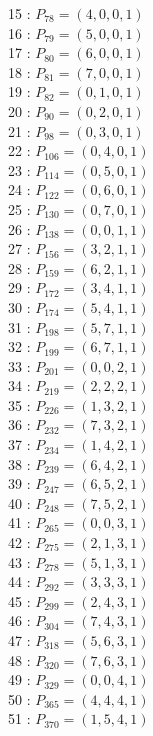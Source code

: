 \documentclass{article}
\begin{document}
{\begin{multicols}{3}
15 : $P_{78}=( 4, 0, 0, 1 )$\\
16 : $P_{79}=( 5, 0, 0, 1 )$\\
17 : $P_{80}=( 6, 0, 0, 1 )$\\
18 : $P_{81}=( 7, 0, 0, 1 )$\\
19 : $P_{82}=( 0, 1, 0, 1 )$\\
20 : $P_{90}=( 0, 2, 0, 1 )$\\
21 : $P_{98}=( 0, 3, 0, 1 )$\\
22 : $P_{106}=( 0, 4, 0, 1 )$\\
23 : $P_{114}=( 0, 5, 0, 1 )$\\
24 : $P_{122}=( 0, 6, 0, 1 )$\\
25 : $P_{130}=( 0, 7, 0, 1 )$\\
26 : $P_{138}=( 0, 0, 1, 1 )$\\
27 : $P_{156}=( 3, 2, 1, 1 )$\\
28 : $P_{159}=( 6, 2, 1, 1 )$\\
29 : $P_{172}=( 3, 4, 1, 1 )$\\
30 : $P_{174}=( 5, 4, 1, 1 )$\\
31 : $P_{198}=( 5, 7, 1, 1 )$\\
32 : $P_{199}=( 6, 7, 1, 1 )$\\
33 : $P_{201}=( 0, 0, 2, 1 )$\\
34 : $P_{219}=( 2, 2, 2, 1 )$\\
35 : $P_{226}=( 1, 3, 2, 1 )$\\
36 : $P_{232}=( 7, 3, 2, 1 )$\\
37 : $P_{234}=( 1, 4, 2, 1 )$\\
38 : $P_{239}=( 6, 4, 2, 1 )$\\
39 : $P_{247}=( 6, 5, 2, 1 )$\\
40 : $P_{248}=( 7, 5, 2, 1 )$\\
41 : $P_{265}=( 0, 0, 3, 1 )$\\
42 : $P_{275}=( 2, 1, 3, 1 )$\\
43 : $P_{278}=( 5, 1, 3, 1 )$\\
44 : $P_{292}=( 3, 3, 3, 1 )$\\
45 : $P_{299}=( 2, 4, 3, 1 )$\\
46 : $P_{304}=( 7, 4, 3, 1 )$\\
47 : $P_{318}=( 5, 6, 3, 1 )$\\
48 : $P_{320}=( 7, 6, 3, 1 )$\\
49 : $P_{329}=( 0, 0, 4, 1 )$\\
50 : $P_{365}=( 4, 4, 4, 1 )$\\
51 : $P_{370}=( 1, 5, 4, 1 )$\\

\end{multicols}}
\end{document}
